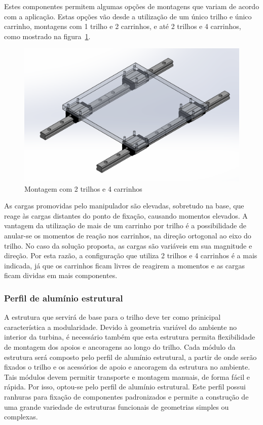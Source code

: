 Estes componentes permitem algumas opções de montagens que variam de acordo com
a aplicação. 
Estas opções vão desde a utilização de um único trilho e único carrinho,
montagens com 1 trilho e 2 carrinhos, e até 2 trilhos e 4
carrinhos, como mostrado na figura~\ref{fig::sist_2por4}.

\begin{figure}[h!]
	\centering
	\includegraphics[width=0.9\columnwidth]{method/figs/construcao/sist_2por4}
	\caption{Montagem com 2 trilhos e 4 carrinhos}
    \label{fig::sist_2por4}
\end{figure}

As cargas promovidas pelo manipulador são elevadas, sobretudo na base, que
reage às cargas distantes do ponto de fixação, causando momentos elevados. 
A vantagem da utilização de mais de um carrinho por trilho é a possibilidade de
anular-se os momentos de reação nos carrinhos, na direção ortogonal ao eixo do
trilho. 
No caso da solução proposta, as cargas são variáveis em sua magnitude e direção.
Por esta razão, a configuração que utiliza 2 trilhos e 4 carrinhos é a mais
indicada, já que os carrinhos ficam livres de reagirem a momentos e as cargas ficam
dividas em mais componentes.

\subsubsection{Perfil de alumínio estrutural} \label{sec::perfil}

A estrutura que servirá de base para o trilho deve ter como prinicipal
característica a modularidade. Devido à geometria variável do ambiente no
interior da turbina, é necessário também que esta estrutura permita 
flexibilidade de montagem dos apoios e ancoragens ao longo do trilho.
Cada módulo da estrutura será composto pelo perfil de alumínio estrutural, a
partir de onde serão fixados o trilho e os acessórios de apoio e ancoragem da
estrutura no ambiente.
Tais módulos devem permitir transporte e montagem manuais, de forma fácil e
rápida.
Por isso, optou-se pelo perfil de alumínio estrutural. Este perfil possui
ranhuras para fixação de componentes padronizados e permite a construção
de uma grande variedade de estruturas funcionais de geometrias simples ou
complexas.

